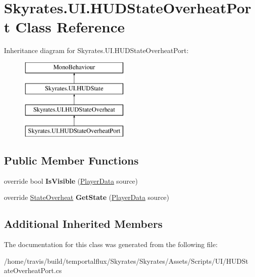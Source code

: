 \hypertarget{class_skyrates_1_1_u_i_1_1_h_u_d_state_overheat_port}{\section{Skyrates.\-U\-I.\-H\-U\-D\-State\-Overheat\-Port Class Reference}
\label{class_skyrates_1_1_u_i_1_1_h_u_d_state_overheat_port}
}
Inheritance diagram for Skyrates.\-U\-I.\-H\-U\-D\-State\-Overheat\-Port\-:\begin{figure}[H]
\begin{center}
\leavevmode
\includegraphics[height=4.000000cm]{class_skyrates_1_1_u_i_1_1_h_u_d_state_overheat_port}
\end{center}
\end{figure}
\subsection*{Public Member Functions}
\begin{DoxyCompactItemize}
\item 
\hypertarget{class_skyrates_1_1_u_i_1_1_h_u_d_state_overheat_port_a053112002c4dc3bc6bb0b79c24f3c37e}{override bool {\bfseries Is\-Visible} (\hyperlink{class_skyrates_1_1_data_1_1_player_data}{Player\-Data} source)}\label{class_skyrates_1_1_u_i_1_1_h_u_d_state_overheat_port_a053112002c4dc3bc6bb0b79c24f3c37e}

\item 
\hypertarget{class_skyrates_1_1_u_i_1_1_h_u_d_state_overheat_port_abf27d3d29d10289e1cba39ac4bed22b2}{override \hyperlink{class_skyrates_1_1_misc_1_1_state_overheat}{State\-Overheat} {\bfseries Get\-State} (\hyperlink{class_skyrates_1_1_data_1_1_player_data}{Player\-Data} source)}\label{class_skyrates_1_1_u_i_1_1_h_u_d_state_overheat_port_abf27d3d29d10289e1cba39ac4bed22b2}

\end{DoxyCompactItemize}
\subsection*{Additional Inherited Members}


The documentation for this class was generated from the following file\-:\begin{DoxyCompactItemize}
\item 
/home/travis/build/temportalflux/\-Skyrates/\-Skyrates/\-Assets/\-Scripts/\-U\-I/H\-U\-D\-State\-Overheat\-Port.\-cs\end{DoxyCompactItemize}
